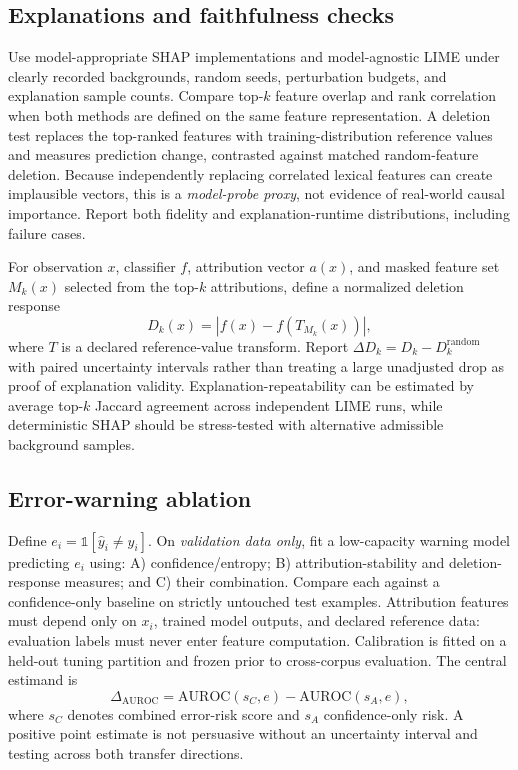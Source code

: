 \documentclass[conference,letterpaper]{IEEEtran}
\begin{document}
\subsection{Explanations and faithfulness checks}
Use model-appropriate SHAP implementations and model-agnostic LIME under clearly recorded backgrounds, random seeds, perturbation budgets, and explanation sample counts. Compare top-\(k\) feature overlap and rank correlation when both methods are defined on the same feature representation. A deletion test replaces the top-ranked features with training-distribution reference values and measures prediction change, contrasted against matched random-feature deletion. Because independently replacing correlated lexical features can create implausible vectors, this is a \emph{model-probe proxy}, not evidence of real-world causal importance. Report both fidelity and explanation-runtime distributions, including failure cases.

For observation \(x\), classifier \(f\), attribution vector \(a(x)\), and masked feature set \(M_k(x)\) selected from the top-\(k\) attributions, define a normalized deletion response
\begin{equation}
D_k(x)=|f(x)-f(T_{M_k}(x))|,
\end{equation}
where \(T\) is a declared reference-value transform. Report \(\Delta D_k=D_k-D_k^{\mathrm{random}}\) with paired uncertainty intervals rather than treating a large unadjusted drop as proof of explanation validity. Explanation-repeatability can be estimated by average top-\(k\) Jaccard agreement across independent LIME runs, while deterministic SHAP should be stress-tested with alternative admissible background samples.

\subsection{Error-warning ablation}
Define \(e_i=\mathbb{1}[\hat y_i\neq y_i]\). On \emph{validation data only}, fit a low-capacity warning model predicting \(e_i\) using: A) confidence/entropy; B) attribution-stability and deletion-response measures; and C) their combination. Compare each against a confidence-only baseline on strictly untouched test examples. Attribution features must depend only on \(x_i\), trained model outputs, and declared reference data: evaluation labels must never enter feature computation. Calibration is fitted on a held-out tuning partition and frozen prior to cross-corpus evaluation. The central estimand is
\begin{equation}
\Delta_{\mathrm{AUROC}}=\mathrm{AUROC}(s_C,e)-\mathrm{AUROC}(s_A,e),
\end{equation}
where \(s_C\) denotes combined error-risk score and \(s_A\) confidence-only risk. A positive point estimate is not persuasive without an uncertainty interval and testing across both transfer directions.
\end{document}
